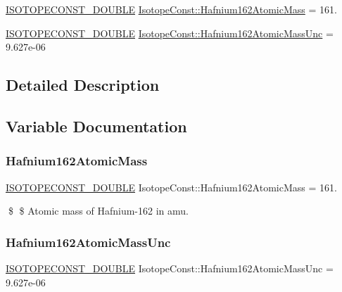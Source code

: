 \begin{DoxyCompactItemize}
\item 
\mbox{\hyperlink{group___isotope_const-_macros_ga8f45a7272ce02c0b4c65c44636ed719a}{I\+S\+O\+T\+O\+P\+E\+C\+O\+N\+S\+T\+\_\+\+D\+O\+U\+B\+LE}} \mbox{\hyperlink{group___isotope_const-_hafnium-_hf162_ga6929ea2eed2094c8dae775448035c8b5}{Isotope\+Const\+::\+Hafnium162\+Atomic\+Mass}} = 161.
\item 
\mbox{\hyperlink{group___isotope_const-_macros_ga8f45a7272ce02c0b4c65c44636ed719a}{I\+S\+O\+T\+O\+P\+E\+C\+O\+N\+S\+T\+\_\+\+D\+O\+U\+B\+LE}} \mbox{\hyperlink{group___isotope_const-_hafnium-_hf162_ga582d6f59f0b76a2c2d46c45d73289da9}{Isotope\+Const\+::\+Hafnium162\+Atomic\+Mass\+Unc}} = 9.\+627e-\/06
\end{DoxyCompactItemize}


\subsection{Detailed Description}


\subsection{Variable Documentation}
\mbox{\label{group___isotope_const-_hafnium-_hf162_ga6929ea2eed2094c8dae775448035c8b5}} 
\subsubsection{\texorpdfstring{Hafnium162\+Atomic\+Mass}{Hafnium162AtomicMass}}
{\footnotesize\ttfamily \mbox{\hyperlink{group___isotope_const-_macros_ga8f45a7272ce02c0b4c65c44636ed719a}{I\+S\+O\+T\+O\+P\+E\+C\+O\+N\+S\+T\+\_\+\+D\+O\+U\+B\+LE}} Isotope\+Const\+::\+Hafnium162\+Atomic\+Mass = 161.}

\$ \$ Atomic mass of Hafnium-\/162 in amu. \mbox{\label{group___isotope_const-_hafnium-_hf162_ga582d6f59f0b76a2c2d46c45d73289da9}} 
\subsubsection{\texorpdfstring{Hafnium162\+Atomic\+Mass\+Unc}{Hafnium162AtomicMassUnc}}
{\footnotesize\ttfamily \mbox{\hyperlink{group___isotope_const-_macros_ga8f45a7272ce02c0b4c65c44636ed719a}{I\+S\+O\+T\+O\+P\+E\+C\+O\+N\+S\+T\+\_\+\+D\+O\+U\+B\+LE}} Isotope\+Const\+::\+Hafnium162\+Atomic\+Mass\+Unc = 9.\+627e-\/06}

